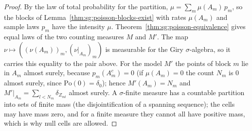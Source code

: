 \begin{proof}
  \leanok
{}
By the law of total probability for the partition, $\mu=\sum_m\mu(A_m)\,p_m$, so the blocks of Lemma~\ref{thm:sg:poisson-blocks-exist} with rates $\mu(A_m)$ and sample laws $p_m$ have the intensity $\mu$. Theorem~\ref{thm:sg:poisson-equivalence} gives equal laws of the two counting measures $M$ and $M'$. The map $\nu\mapsto((\nu(A_m))_m,(\nu|_{A_m})_m)$ is measurable for the Giry $\sigma$-algebra, so it carries this equality to the pair above. For the model $M'$ the points of block $m$ lie in $A_m$ almost surely, because $p_m(A_m^c)=0$ (if $\mu(A_m)=0$ the count $N_m$ is $0$ almost surely, since $\mathrm{Po}(0)=\delta_0$); hence $M'(A_m)=N_m$ and $M'|_{A_m}=\sum_{l<N_m}\delta_{Z_{ml}}$ almost surely. A $\sigma$-finite measure has a countable partition into sets of finite mass (the disjointification of a spanning sequence); the cells may have mass zero, and for a finite measure they cannot all have positive mass, which is why null cells are allowed.
\end{proof}

